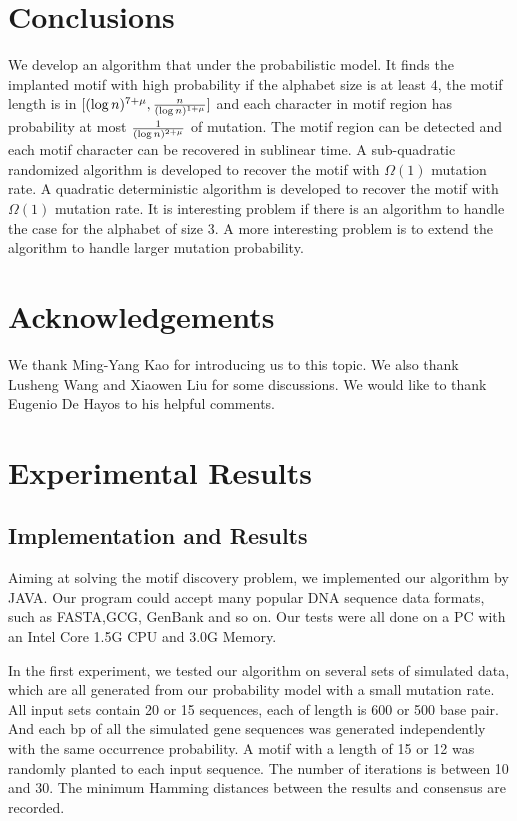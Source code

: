 \documentclass[11pt]{article}
\begin{document}
\section{Conclusions}
We develop an algorithm that under the probabilistic model. It finds
the implanted motif with high probability if the alphabet size is at
least $4$, the motif length is in $[(\log n)^{7+\mu}, {n\over (\log
n)^{1+\mu}}]$ and each character in motif region has probability at
most ${1\over (\log n)^{2+\mu}}$ of mutation. The motif region can
be detected and each motif character can be recovered in sublinear
time. A sub-quadratic randomized algorithm is developed to recover
the motif with $\Omega(1)$ mutation rate. A quadratic deterministic
algorithm is developed to recover the motif with $\Omega(1)$
mutation rate. It is interesting problem if there is an algorithm to
handle the case for the alphabet of size $3$. A more interesting
problem is to extend the algorithm to handle larger mutation
probability.



 \section*{Acknowledgements} We thank Ming-Yang Kao for introducing
 us to this topic. We also thank
 Lusheng Wang and Xiaowen Liu for some discussions. We would like to
 thank Eugenio De Hayos to his helpful comments.






\section{Experimental Results}



\subsection{Implementation and Results}
\noindent Aiming at solving the motif discovery problem, we
implemented our algorithm by JAVA. Our program could accept many
popular DNA sequence data formats, such as FASTA,GCG, GenBank and so
on. Our tests were all done on a PC with an Intel Core 1.5G CPU and
3.0G Memory.

In the first experiment, we tested our  algorithm on several sets of
simulated data, which are all generated from our probability model
with a small mutation rate. All input sets contain 20 or 15
sequences, each of length is 600 or 500 base pair. And each bp of
all the simulated gene sequences was generated independently with
the same occurrence probability. A motif with a length of 15 or 12
was randomly planted to each input sequence. The number of
iterations is between 10 and 30. The minimum Hamming distances
between the results and consensus are recorded.
\end{document}
